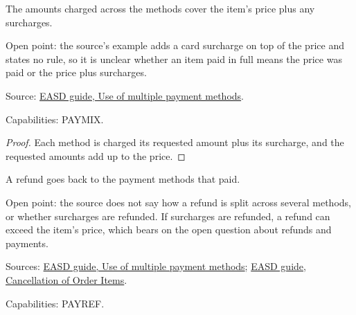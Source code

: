 \begin{theorem}
  \label{thm:c14-amount-covers-price}
  The amounts charged across the methods cover the item's price plus any
  surcharges.

  Open point: the source's example adds a card surcharge on top of the price
  and states no rule, so it is unclear whether an item paid in full means the
  price was paid or the price plus surcharges.

  Source: \href{https://standards.atlassian.net/wiki/spaces/EASD/pages/2592899087/Use+of+multiple+payment+methods+to+pay+for+a+single+item}{EASD guide, Use of multiple payment methods}.

  Capabilities: PAYMIX.
\end{theorem}
\begin{proof}
  Each method is charged its requested amount plus its surcharge, and the
  requested amounts add up to the price.
\end{proof}

\begin{definition}
  \label{def:c17-refund-methods}
  \notready
  A refund goes back to the payment methods that paid.

  Open point: the source does not say how a refund is split across several
  methods, or whether surcharges are refunded.  If surcharges are refunded, a
  refund can exceed the item's price, which bears on the open question about
  refunds and payments.

  Sources: \href{https://standards.atlassian.net/wiki/spaces/EASD/pages/2592899087/Use+of+multiple+payment+methods+to+pay+for+a+single+item}{EASD guide, Use of multiple payment methods};
  \href{https://standards.atlassian.net/wiki/spaces/EASD/pages/574783569/Cancellation+of+Order+Items}{EASD guide, Cancellation of Order Items}.

  Capabilities: PAYREF.
\end{definition}


